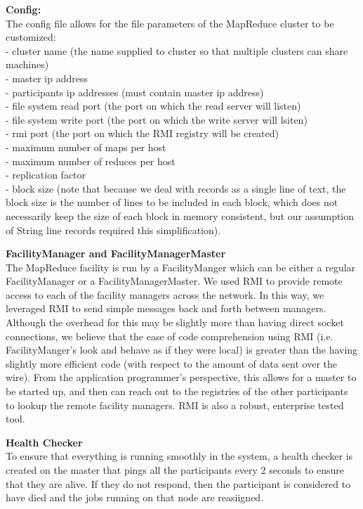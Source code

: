 \documentclass[11pt]{article}
\begin{document}
\textbf{Config:}
\\ The config file allows for the file parameters of the MapReduce cluster to be customized:
\\ - cluster name (the name supplied to cluster so that multiple clusters can share machines)
\\ - master ip address
\\ - participants ip addresses (must contain master ip address)
\\ - file system read port (the port on which the read server will listen)
\\ - file system write port (the port on which the write server will lsiten)
\\ - rmi port (the port on which the RMI registry will be created)
\\ - maximum number of maps per host 
\\ - maximum number of reduces per host 
\\ - replication factor
\\ - block size (note that because we deal with records as a single line of text, the block size is the number of lines to be included in each block, which does not necessarily keep the size of each block in memory consistent, but our assumption of String line records required this simplification).

\textbf{FacilityManager and FacilityManagerMaster}
\\The MapReduce facility is run by a FacilityManger which can be either a regular FacilityManager or a FacilityManagerMaster. We used RMI to provide remote access to each of the facility managers across the network. In this way, we leveraged RMI to send simple messages back and forth between managers. Although the overhead for this may be slightly more than having direct socket connections, we believe that the ease of code comprehension using RMI (i.e. FacilityManger's look and behave as if they were local) is greater than the having slightly more efficient code (with respect to the amount of data sent over the wire). From the application programmer's perspective, this allows for a master to be started up, and then can reach out to the registries of the other participants to lookup the remote facility managers. RMI is also a robust, enterprise tested tool.

\textbf{Health Checker}
\\ To ensure that everything is running smoothly in the system, a health checker is created on the master that pings all the participants every 2 seconds to ensure that they are alive. If they do not respond, then the participant is considered to have died and the jobs running on that node are reasiigned. 
\end{document}
